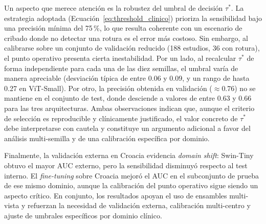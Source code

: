 Un aspecto que merece atención es la robustez del umbral de decisión $\tau^*$. La estrategia adoptada (Ecuación~\ref{eq:threshold_clinico}) prioriza la sensibilidad bajo una precisión mínima del 75\,\%, lo que resulta coherente con un escenario de cribado donde no detectar una rotura es el error más costoso. Sin embargo, al calibrarse sobre un conjunto de validación reducido (188 estudios, 36 con rotura), el punto operativo presenta cierta inestabilidad. Por un lado, al recalcular $\tau^*$ de forma independiente para cada una de las diez semillas, el umbral varía de manera apreciable (desviación típica de entre 0.06 y 0.09, y un rango de hasta 0.27 en ViT-Small). Por otro, la precisión obtenida en validación ($\approx$0.76) no se mantiene en el conjunto de test, donde desciende a valores de entre 0.63 y 0.66 para las tres arquitecturas. Ambas observaciones indican que, aunque el criterio de selección es reproducible y clínicamente justificado, el valor concreto de $\tau^*$ debe interpretarse con cautela y constituye un argumento adicional a favor del análisis multi-semilla y de una calibración específica por dominio.

Finalmente, la validación externa en Croacia evidencia \textit{domain shift}: Swin-Tiny obtuvo el mayor AUC externo, pero la sensibilidad disminuyó respecto al test interno. El \textit{fine-tuning} sobre Croacia mejoró el AUC en el subconjunto de prueba de ese mismo dominio, aunque la calibración del punto operativo sigue siendo un aspecto crítico. En conjunto, los resultados apoyan el uso de ensambles multi-vista y refuerzan la necesidad de validación externa, calibración multi-centro y ajuste de umbrales específicos por dominio clínico.
